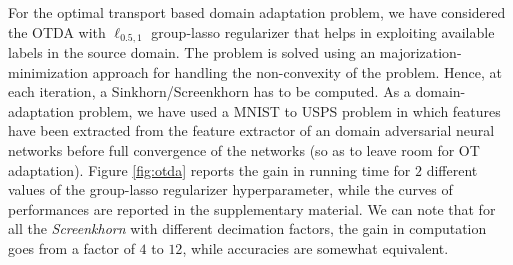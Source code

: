 For the optimal transport based domain adaptation problem, we have considered the
OTDA with $\ell_{0.5,1}$ group-lasso regularizer that helps in exploiting available labels in the source domain. The problem is solved using an majorization-minimization approach 
for handling the non-convexity of the problem. Hence, at each iteration, a Sinkhorn/Screenkhorn has to be computed. As a domain-adaptation problem, we have
used a MNIST to USPS problem in which features have been extracted from the
feature extractor of an domain adversarial neural networks \cite{ganin2016domain} before full convergence of the networks (so as to leave room for OT adaptation). 
Figure \ref{fig:otda} reports the gain in running time for $2$ different values
of the group-lasso regularizer hyperparameter, while the curves of performances are
reported in the supplementary material. We can note that for all the  \emph{Screenkhorn} with different decimation factors, the gain in computation goes from a factor of $4$ to $12$, while accuracies are somewhat equivalent.



